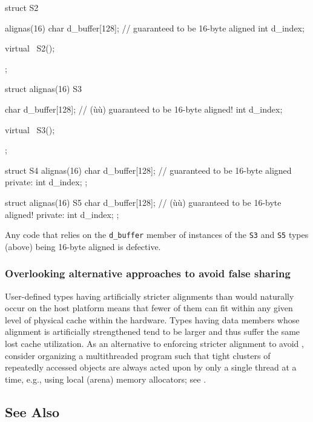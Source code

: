 \begin{emcppslisting}
struct S2 {
    alignas(16) char d_buffer[128];  // guaranteed to be 16-byte aligned
                int  d_index;

    virtual ~S2();
};

struct alignas(16) S3 {
    char d_buffer[128];              // (ù{}ù) guaranteed to be 16-byte aligned!
    int  d_index;

    virtual ~S3();
};

struct S4 {
    alignas(16) char d_buffer[128];  // guaranteed to be 16-byte aligned
private:
                int  d_index;
};

struct alignas(16) S5 {
    char d_buffer[128];              // (ù{}ù) guaranteed to be 16-byte aligned!
private:
    int  d_index;
};
\end{emcppslisting}

Any code that relies on the \lstinline!d_buffer! member of instances of the \lstinline!S3! and \lstinline!S5! types (above) being 16-byte aligned is defective.

\subsubsection[Overlooking alternative approaches to avoid false sharing]{Overlooking alternative approaches to avoid false sharing}\label{stricter-alignment-might-reduce-cache-utilization}\label{overlooking-alternative-approaches-to-avoid-false-sharing}

User-defined types having artificially stricter alignments than would
naturally occur on the host platform means that fewer of them can fit
within any given level of physical cache within the hardware. Types
having data members whose alignment is artificially strengthened tend to be
larger and thus suffer the same lost cache utilization. As an
alternative to enforcing stricter alignment to avoid , consider organizing a multithreaded program such that tight
clusters of repeatedly accessed objects are always acted upon by only a
single thread at a time, e.g., using local (arena) memory allocators;
see .

\subsection[See Also]{See Also}\label{see-also}

